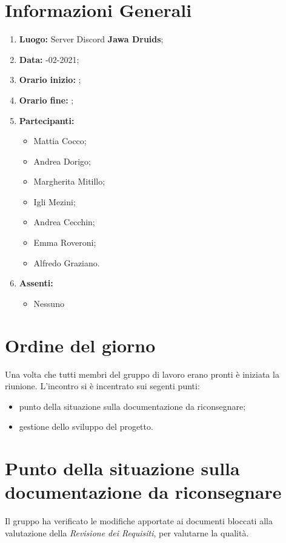 \newpage
\section{Informazioni Generali}
\begin{enumerate}
  \item \textbf{Luogo:} \normalfont Server Discord \textbf{Jawa Druids};
  \item \textbf{Data:} -02-2021;
  \item \textbf{Orario inizio:} ;
  \item \textbf{Orario fine:} ;
  \item \textbf{Partecipanti:}
  \begin{itemize}
    \item Mattia Cocco;
    \item Andrea Dorigo;
    \item Margherita Mitillo;
    \item Igli Mezini;
    \item Andrea Cecchin;
    \item Emma Roveroni;
    \item Alfredo Graziano.
  \end{itemize}
  \item \textbf{Assenti:}
  \begin{itemize}
    \item Nessuno
  \end{itemize}
\end{enumerate}
\section{Ordine del giorno}
Una volta che tutti membri del gruppo di lavoro erano pronti è iniziata la riunione. L'incontro si è incentrato sui segenti punti:
\begin{itemize}
  \item punto della situazione sulla documentazione da riconsegnare;
  \item gestione dello sviluppo del progetto.
\end{itemize}

\section{Punto della situazione sulla documentazione da riconsegnare}
Il gruppo ha verificato le modifiche apportate ai documenti bloccati alla valutazione della \textit{Revisione dei Requisiti}, per valutarne la qualità.


